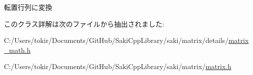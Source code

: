 転置行列に変換 



このクラス詳解は次のファイルから抽出されました\+:\begin{DoxyCompactItemize}
\item 
C\+:/\+Users/tokir/\+Documents/\+Git\+Hub/\+Saki\+Cpp\+Library/saki/matrix/details/\mbox{\hyperlink{matrix__math_8h}{matrix\+\_\+math.\+h}}\item 
C\+:/\+Users/tokir/\+Documents/\+Git\+Hub/\+Saki\+Cpp\+Library/saki/matrix/\mbox{\hyperlink{matrix_2matrix_8h}{matrix.\+h}}\end{DoxyCompactItemize}
